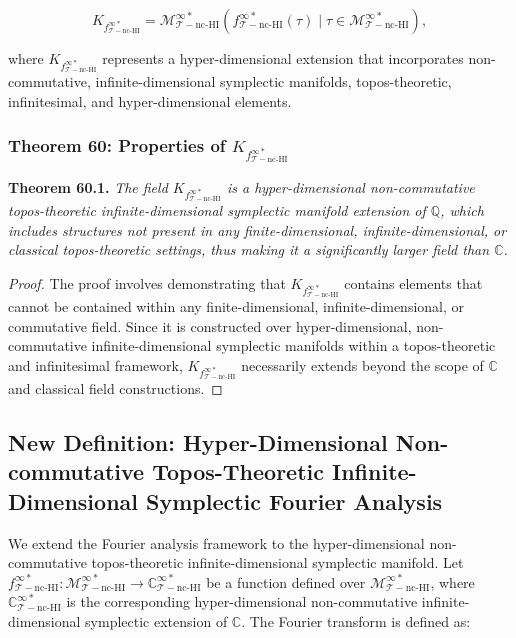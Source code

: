 \documentclass{article}
\begin{document}
\[
K_{f_{\mathcal{T}-\text{nc-HI}}^{\infty *}} = \mathcal{M}_{\mathcal{T}-\text{nc-HI}}^{\infty *}(f_{\mathcal{T}-\text{nc-HI}}^{\infty *}(\tau) \mid \tau \in \mathcal{M}_{\mathcal{T}-\text{nc-HI}}^{\infty *}),
\]

where \(K_{f_{\mathcal{T}-\text{nc-HI}}^{\infty *}}\) represents a hyper-dimensional extension that incorporates non-commutative, infinite-dimensional symplectic manifolds, topos-theoretic, infinitesimal, and hyper-dimensional elements.

\subsubsection{Theorem 60: Properties of \(K_{f_{\mathcal{T}-\text{nc-HI}}^{\infty *}}\)}
\textbf{Theorem 60.1.} \textit{The field \(K_{f_{\mathcal{T}-\text{nc-HI}}^{\infty *}}\) is a hyper-dimensional non-commutative topos-theoretic infinite-dimensional symplectic manifold extension of \(\mathbb{Q}\), which includes structures not present in any finite-dimensional, infinite-dimensional, or classical topos-theoretic settings, thus making it a significantly larger field than \(\mathbb{C}\).}

\begin{proof}
The proof involves demonstrating that \(K_{f_{\mathcal{T}-\text{nc-HI}}^{\infty *}}\) contains elements that cannot be contained within any finite-dimensional, infinite-dimensional, or commutative field. Since it is constructed over hyper-dimensional, non-commutative infinite-dimensional symplectic manifolds within a topos-theoretic and infinitesimal framework, \(K_{f_{\mathcal{T}-\text{nc-HI}}^{\infty *}}\) necessarily extends beyond the scope of \(\mathbb{C}\) and classical field constructions.
\end{proof}

\subsection{New Definition: Hyper-Dimensional Non-commutative Topos-Theoretic Infinite-Dimensional Symplectic Fourier Analysis}
We extend the Fourier analysis framework to the hyper-dimensional non-commutative topos-theoretic infinite-dimensional symplectic manifold. Let \(f_{\mathcal{T}-\text{nc-HI}}^{\infty *}: \mathcal{M}_{\mathcal{T}-\text{nc-HI}}^{\infty *} \to \mathbb{C}_{\mathcal{T}-\text{nc-HI}}^{\infty *}\) be a function defined over \(\mathcal{M}_{\mathcal{T}-\text{nc-HI}}^{\infty *}\), where \(\mathbb{C}_{\mathcal{T}-\text{nc-HI}}^{\infty *}\) is the corresponding hyper-dimensional non-commutative infinite-dimensional symplectic extension of \(\mathbb{C}\). The Fourier transform is defined as:
\end{document}
